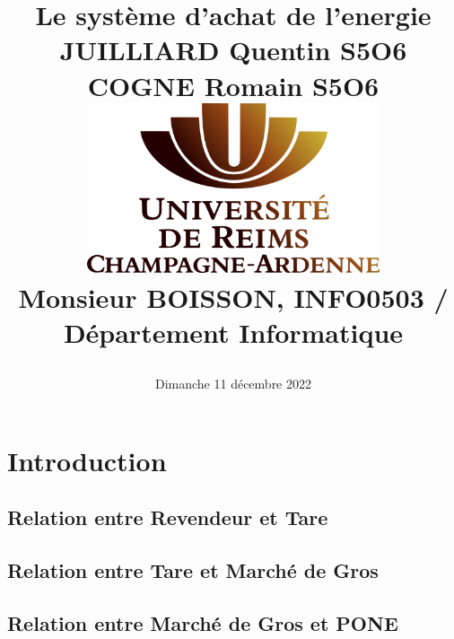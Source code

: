 \documentclass[a4paper, 11pt, french]{report}
\begin{document}
\begin{title}

\title{
    {\Huge Le système d'achat de l'energie}\\
    \vspace{1 cm}
    {\LARGE JUILLIARD Quentin S5O6}\\
    {\LARGE COGNE Romain S5O6}\\
    \vspace{2.5 cm}
    {\includegraphics[width=90mm, height=50mm]{logo_univ}}\\
    \vspace{2.5 cm}
    {\Large Monsieur BOISSON, INFO0503 / Département Informatique}\\
    \vspace{1 cm}
    {\date{\Large Dimanche 11 décembre 2022}}}
\end{title}

\maketitle
\tableofcontents
\clearpage



\section{Introduction}


\subsection{Relation entre Revendeur et Tare}


\subsection{Relation entre Tare et Marché de Gros}


\subsection{Relation entre Marché de Gros et PONE}

\end{document}
